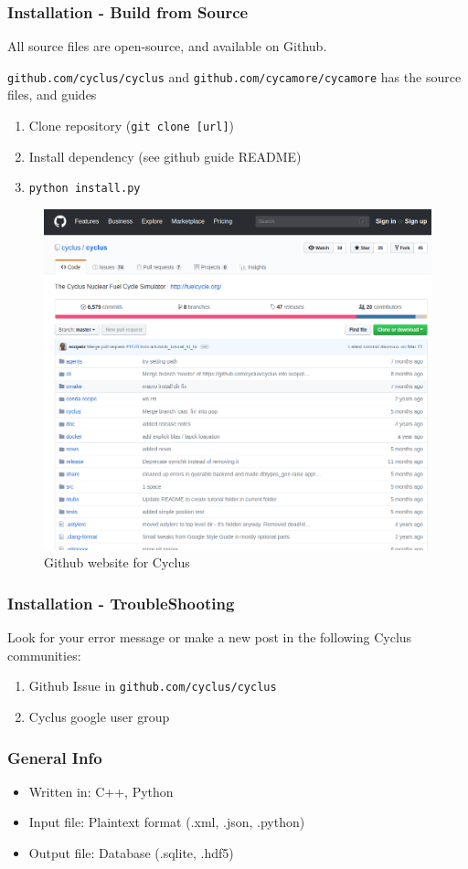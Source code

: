 \begin{frame}
	\frametitle{Installation - Build from Source}
    All source files are open-source, and available on Github.

	\texttt{github.com/cyclus/cyclus} and \texttt{github.com/cycamore/cycamore} has the source files, and guides
	\begin{enumerate}
		\item Clone repository (\texttt{git clone [url]})
		\item Install dependency (see github guide README)
		\item \texttt{python install.py}
	\end{enumerate}

	\begin{figure}[htbp!]
        \begin{center}
                \includegraphics[width=.6\textwidth]{./images/github.png}
        \end{center}
        \caption{Github website for Cyclus}
	\end{figure}
\end{frame}


\begin{frame}
	\frametitle{Installation - TroubleShooting}
	Look for your error message or make a new post in the following Cyclus communities:
	\begin{enumerate}
		\item Github Issue in \texttt{github.com/cyclus/cyclus}
		\item Cyclus google user group
	\end{enumerate}
\end{frame}

\begin{frame}
	\frametitle{General Info}
	\begin{itemize}
		\item Written in: C++, Python
		\item Input file: Plaintext format (.xml, .json, .python)
		\item Output file: Database (.sqlite, .hdf5)
	\end{itemize}
\end{frame}

